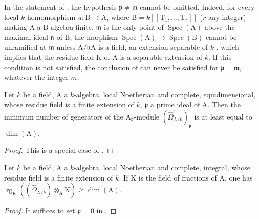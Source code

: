 \begin{remark}[18.11.6]
\label{IV.18.11.6}
In the statement of , the hypothesis $\mathfrak{p}\neq\mathfrak{m}$ cannot be omitted.
Indeed, for every local $k$-homomorphism $u:\mathrm{B}\to\mathrm{A}$, where $\mathrm{B}=k[[\mathrm{T}_1,\ldots,\mathrm{T}_r]]$ ($r$ any integer) making $\mathrm{A}$ a $\mathrm{B}$-algebra finite, $\mathfrak{m}$ is the only point of $\operatorname{Spec}(\mathrm{A})$ above the maximal ideal $\mathfrak{n}$ of $\mathrm{B}$; the morphism $\operatorname{Spec}(\mathrm{A})\to\operatorname{Spec}(\mathrm{B})$ cannot be unramified at $\mathfrak{m}$ unless $\mathrm{A}/\mathfrak{n}\mathrm{A}$ is a field, an extension separable of $k$ , which implies that the residue field $\mathrm{K}$ of $\mathrm{A}$ is a separable extension of $k$.
If this condition is not satisfied, the conclusion of  can never be satisfied for $\mathfrak{p}=\mathfrak{m}$, whatever the integer $m$.
\end{remark}

\begin{corollary}[18.11.7]
\label{IV.18.11.7}
Let $k$ be a field, $\mathrm{A}$ a $k$-algebra, local Noetherian and complete, equidimensional, whose residue field is a finite extension of $k$, $\mathfrak{p}$ a prime ideal of $\mathrm{A}$.
Then the minimum number of generators of the $\mathrm{A}_\mathfrak{p}$-module $(\hat{\Omega}^1_{\mathrm{A}/k})_\mathfrak{p}$ is at least equal to $\dim(\mathrm{A})$.
\end{corollary}

\begin{proof}
This is a special case of .
\end{proof}


\begin{corollary}[18.11.8]
\label{IV.18.11.8}
Let $k$ be a field, $\mathrm{A}$ a $k$-algebra, local Noetherian and complete, integral, whose residue field is a finite extension of $k$.
If $\mathrm{K}$ is the field of fractions of $\mathrm{A}$, one has $\operatorname{rg}_{\mathrm{K}}((\hat{\Omega}^1_{\mathrm{A}/k})\otimes_{\mathrm{A}}\mathrm{K})\geq\dim(\mathrm{A})$.
\end{corollary}

\begin{proof}
It suffices to set $\mathfrak{p}=0$ in .
\end{proof}


